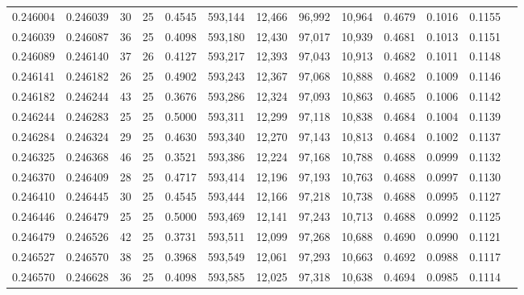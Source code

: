 \begin{tabular}{rrrrrrrrrrrrr}
0.246004 & 0.246039 &    30 &  25 &                                     0.4545 & 593,144 &  12,466 &  96,992 &  10,964 & 0.4679 & 0.1016 & 0.1155 \\
0.246039 & 0.246087 &    36 &  25 &                                     0.4098 & 593,180 &  12,430 &  97,017 &  10,939 & 0.4681 & 0.1013 & 0.1151 \\
0.246089 & 0.246140 &    37 &  26 &                                     0.4127 & 593,217 &  12,393 &  97,043 &  10,913 & 0.4682 & 0.1011 & 0.1148 \\
0.246141 & 0.246182 &    26 &  25 &                                     0.4902 & 593,243 &  12,367 &  97,068 &  10,888 & 0.4682 & 0.1009 & 0.1146 \\
0.246182 & 0.246244 &    43 &  25 &                                     0.3676 & 593,286 &  12,324 &  97,093 &  10,863 & 0.4685 & 0.1006 & 0.1142 \\
0.246244 & 0.246283 &    25 &  25 &                                     0.5000 & 593,311 &  12,299 &  97,118 &  10,838 & 0.4684 & 0.1004 & 0.1139 \\
0.246284 & 0.246324 &    29 &  25 &                                     0.4630 & 593,340 &  12,270 &  97,143 &  10,813 & 0.4684 & 0.1002 & 0.1137 \\
0.246325 & 0.246368 &    46 &  25 &                                     0.3521 & 593,386 &  12,224 &  97,168 &  10,788 & 0.4688 & 0.0999 & 0.1132 \\
0.246370 & 0.246409 &    28 &  25 &                                     0.4717 & 593,414 &  12,196 &  97,193 &  10,763 & 0.4688 & 0.0997 & 0.1130 \\
0.246410 & 0.246445 &    30 &  25 &                                     0.4545 & 593,444 &  12,166 &  97,218 &  10,738 & 0.4688 & 0.0995 & 0.1127 \\
0.246446 & 0.246479 &    25 &  25 &                                     0.5000 & 593,469 &  12,141 &  97,243 &  10,713 & 0.4688 & 0.0992 & 0.1125 \\
0.246479 & 0.246526 &    42 &  25 &                                     0.3731 & 593,511 &  12,099 &  97,268 &  10,688 & 0.4690 & 0.0990 & 0.1121 \\
0.246527 & 0.246570 &    38 &  25 &                                     0.3968 & 593,549 &  12,061 &  97,293 &  10,663 & 0.4692 & 0.0988 & 0.1117 \\
0.246570 & 0.246628 &    36 &  25 &                                     0.4098 & 593,585 &  12,025 &  97,318 &  10,638 & 0.4694 & 0.0985 & 0.1114 \\

\end{tabular}
